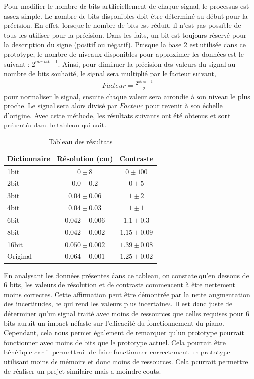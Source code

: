 \documentclass[11pt,letterpaper]{article}
\begin{document}
Pour modifier le nombre de bits artificiellement de chaque signal, le processus est assez simple.
Le nombre de bits disponibles doit être déterminé au début pour la précision. En effet, lorsque le nombre de bits est réduit,
il n'est pas possible de tous les utiliser pour la précision. Dans les faits, un bit est toujours réservé pour la description du signe (positif ou négatif).
Puisque la base 2 est utilisée dans ce prototype, le nombre de niveaux disponibles pour approximer
les données est le suivant :
$ 2^{nbr\_bit -1}$.
Ainsi, pour diminuer la précision des valeurs du signal au nombre de bits souhaité,
le signal sera multiplié par le facteur suivant, 
\begin{align}
Facteur=\frac{ 2^{nbr_bit -1}}{2} 
\end{align}
pour normaliser le signal, ensuite chaque
valeur sera arrondie à son niveau le plus proche. Le signal sera alors divisé par
 $Facteur$ 
 pour revenir à son échelle d'origine. Avec cette méthode, les résultats suivants ont été obtenus et sont présentés dans le tableau qui suit.
\begin{table}[ht]
    \centering
    \begin{tabular}{l c c}
    \hline
    Dictionnaire & Résolution (cm) & Contraste  \\ \hline
    1bit & $0 \pm 8$ & $0 \pm 100$ \\
    2bit & $0.0 \pm 0.2$ & $0 \pm 5$ \\
    3bit & $0.04 \pm 0.06$ & $1 \pm 2$ \\
    4bit & $0.04 \pm 0.03$ & $1 \pm 1$ \\
    6bit & $0.042 \pm 0.006$ & $1.1 \pm 0.3$ \\
    8bit & $0.042 \pm 0.002$ & $1.15 \pm 0.09$ \\
    16bit & $0.050 \pm 0.002$ & $1.39 \pm 0.08$ \\
    Original & $0.064 \pm 0.001$ & $1.25 \pm 0.02$ \\
    \hline
    \end{tabular}
    \caption{Tableau des résultats }
  \end{table}
  
  
En analysant les données présentes dans ce tableau, on constate qu'en dessous de 6 bits,  
les valeurs de résolution et de contraste commencent à être nettement moins correctes.  
Cette affirmation peut être démontrée par la nette augmentation des incertitudes, ce qui  
rend les valeurs plus incertaines. Il est donc juste de déterminer qu'un signal traité  
avec moins de ressources que celles requises pour 6 bits aurait un impact néfaste sur  
l'efficacité du fonctionnement du piano. Cependant, cela nous permet également de remarquer  
qu'un prototype pourrait fonctionner avec moins de bits que le prototype actuel.  
Cela pourrait être bénéfique car il permettrait de faire fonctionner correctement un prototype  
utilisant moins de mémoire et donc moins de ressources. Cela pourrait permettre de réaliser un projet 
similaire mais a moindre couts. 
\end{document}
